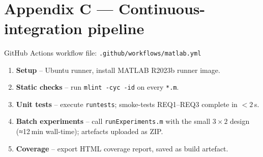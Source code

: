 \
\section*{Appendix C — Continuous-integration pipeline}

GitHub Actions workflow file: \texttt{.github/workflows/matlab.yml}

\begin{enumerate}[leftmargin=1.8em]
  \item \textbf{Setup} – Ubuntu runner, install MATLAB R2023b runner image.
  \item \textbf{Static checks} – run \texttt{mlint -cyc -id} on every \texttt{*.m}.
  \item \textbf{Unit tests} – execute \texttt{runtests}; smoke-tests REQ1–REQ3
        complete in $<\!2$ s.
  \item \textbf{Batch experiments} – call \texttt{runExperiments.m} with the small
        $3\times2$ design (≈12 min wall-time); artefacts uploaded as ZIP.
  \item \textbf{Coverage} – export HTML coverage report, saved as build artefact.
\end{enumerate}
